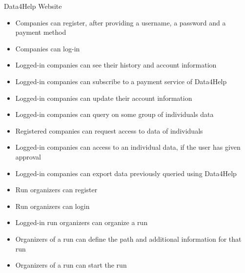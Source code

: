 \noindent Data4Help Website
\begin{itemize}
    \item Companies can register, after providing a username, a password and a payment method
    \item Companies can log-in
    \item Logged-in companies can see their history and account information
    \item Logged-in companies can subscribe to a payment service of Data4Help
    \item Logged-in companies can update their account information
    \item Logged-in companies can query on some group of individuals data
    \item Registered companies can request access to data of individuals
    \item Logged-in companies can access to an individual data, if the user has given approval
    \item Logged-in companies can export data previously queried using Data4Help
    
    \item Run organizers can register
    \item Run organizers can login
    \item Logged-in run organizers can organize a run
    \item Organizers of a run can define the path and additional information for that run
    \item Organizers of a run can start the run
    
\end{itemize}

